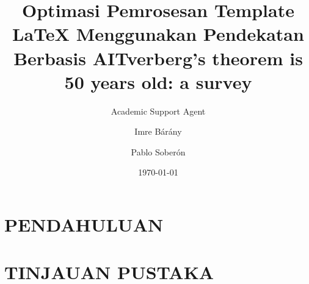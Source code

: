 \documentclass{article}
\title{Optimasi Pemrosesan Template LaTeX Menggunakan Pendekatan Berbasis AI}
\author{Academic Support Agent}
\date{\today}
\begin{document}
\maketitle

\begin{abstract}

\end{abstract}

\chapter{PENDAHULUAN}


\chapter{TINJAUAN PUSTAKA}


\usepackage{amsmath, amssymb, amscd, amsthm, amsfonts}
\usepackage{graphicx}
\usepackage{hyperref}

\oddsidemargin 0pt
\evensidemargin 0pt
\marginparwidth 40pt
\marginparsep 10pt
\topmargin -20pt
\headsep 10pt
\textheight 8.7in
\textwidth 6.65in
\linespread{1.2}

\title{Tverberg's theorem is 50 years old: a survey}
\author{Imre B\'ar\'any \and Pablo Sober\'on}
\date{}

\newtheorem{theorem}{Theorem}
\newtheorem{lemma}[theorem]{Lemma}
\newtheorem{conjecture}[theorem]{Conjecture}

\newcommand{\rr}{\mathbb{R}}

\newcommand{\al}{\alpha}
\DeclareMathOperator{\conv}{conv}
\DeclareMathOperator{\aff}{aff}
\end{document}
